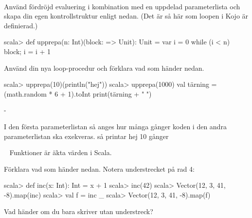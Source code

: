 




\QUESTBEGIN

\Task  \what~

\Subtask Använd fördröjd evaluering i kombination med en uppdelad parameterlista och skapa din egen kontrollstruktur enligt nedan. (Det är så här som loopen  i Kojo är definierad.)
\begin{REPL}
scala> def upprepa(n: Int)(block: => Unit): Unit = {
         var i = 0
         while (i < n) {block; i = i + 1}
       }
\end{REPL}

\Subtask Använd din nya loop-procedur och förklara vad som händer nedan.
\begin{REPL}
scala> upprepa(10)(println("hej"))
scala> upprepa(1000){
  val tärning = (math.random * 6 + 1).toInt
  print(tärning + " ")
}
\end{REPL}



\SOLUTION


\TaskSolved \what


\SubtaskSolved  -

\SubtaskSolved  I den första parameterlistan så anges hur många gånger koden i den andra parameterlistan ska exekveras. så  printar hej 10 gånger



\QUESTEND









\QUESTBEGIN

\Task  \what~  Funktioner är äkta värden i Scala.

\Subtask \label{subtask:funcval} Förklara vad som händer nedan. Notera understrecket på rad 4:

\begin{REPL}[numbers=left, numberstyle=\color{black}\ttfamily\scriptsize\selectfont]
scala> def inc(x: Int): Int = x + 1
scala> inc(42)
scala> Vector(12, 3, 41, -8).map(inc)
scala> val f = inc _
scala> Vector(12, 3, 41, -8).map(f)
\end{REPL}

\Subtask Vad händer om du bara skriver  utan understreck?


